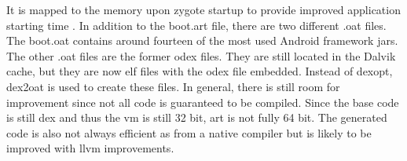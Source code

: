 It is mapped to the memory upon zygote startup to provide improved application starting time .
In addition to the boot.art file, there are two different .oat files.
The boot.oat contains around fourteen of the most used Android framework \gls{jar}s.
The other .oat files are the former \gls{odex} files.
They are still located in the Dalvik cache, but they are now \gls{elf} files with the odex file embedded.
Instead of \gls{dexopt}, \gls{dex2oat} is used to create these files. \cite{andevconDalvikART} \cite{developersConfigureArt} \cite{androidArt} \cite{intelArt}
\newline
In general, there is still room for improvement since not all code is guaranteed to be compiled.
Since the base code is still dex and thus the \gls{vm} is still 32 bit, \gls{art} is not fully 64 bit.
The generated code is also not always efficient as from a native compiler but is likely to be improved with \gls{llvm} improvements.
